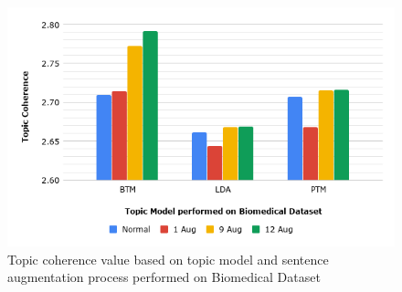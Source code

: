 \documentclass[conference]{IEEEtran}
\begin{document}
\begin{figure} [b]
	\includegraphics[scale=0.425]{topic3.png}
	\caption{Topic coherence value based on topic model and sentence augmentation process performed on Biomedical Dataset}
\label{fig_tmv}
\end{figure}
\end{document}
